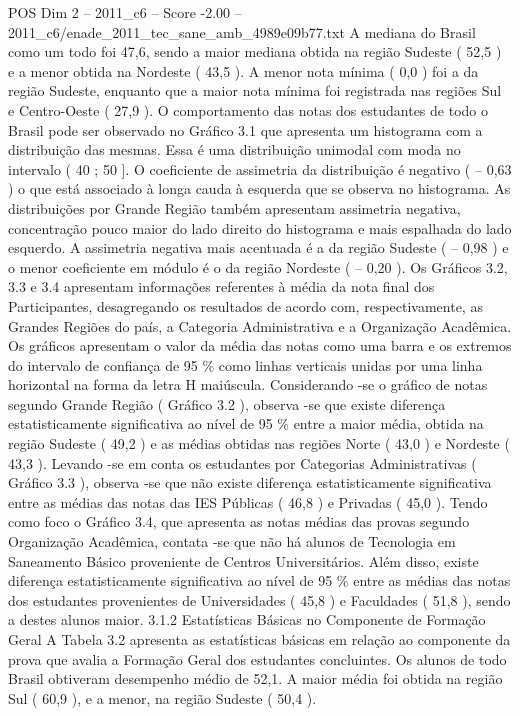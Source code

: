 \begin{textsample}{POS Dim 2 – 2011\_c6 – Score -2.00 – 2011\_c6/enade\_2011\_tec\_sane\_amb\_4989e09b77.txt}
A mediana do Brasil como um todo foi 47,6, sendo a maior mediana obtida na região Sudeste ( 52,5 ) e a menor obtida na Nordeste ( 43,5 ).
A menor nota mínima ( 0,0 ) foi a da região Sudeste, enquanto que a maior nota mínima foi registrada nas regiões Sul e Centro-Oeste ( 27,9 ).
O comportamento das notas dos estudantes de todo o Brasil pode ser observado no Gráfico 3.1 que apresenta um histograma com a distribuição das mesmas.
Essa é uma distribuição unimodal com moda no intervalo ( 40 ; 50 ].
O coeficiente de assimetria da distribuição é negativo ( – 0,63 ) o que está associado à longa cauda à esquerda que se observa no histograma.
As distribuições por Grande Região também apresentam assimetria negativa, concentração pouco maior do lado direito do histograma e mais espalhada do lado esquerdo.
A assimetria negativa mais acentuada é a da região Sudeste ( – 0,98 ) e o menor coeficiente em módulo é o da região Nordeste ( – 0,20 ).
Os Gráficos 3.2, 3.3 e 3.4 apresentam informações referentes à média da nota final dos Participantes, desagregando os resultados de acordo com, respectivamente, as Grandes Regiões do país, a Categoria Administrativa e a Organização Acadêmica.
Os gráficos apresentam o valor da média das notas como uma barra e os extremos do intervalo de confiança de 95 \% como linhas verticais unidas por uma linha horizontal na forma da letra H maiúscula.
Considerando -se o gráfico de notas segundo Grande Região ( Gráfico 3.2 ), observa -se que existe diferença estatisticamente significativa ao nível de 95 \% entre a maior média, obtida na região Sudeste ( 49,2 ) e as médias obtidas nas regiões Norte ( 43,0 ) e Nordeste ( 43,3 ).
Levando -se em conta os estudantes por Categorias Administrativas ( Gráfico 3.3 ), observa -se que não existe diferença estatisticamente significativa entre as médias das notas das IES Públicas ( 46,8 ) e Privadas ( 45,0 ).
Tendo como foco o Gráfico 3.4, que apresenta as notas médias das provas segundo Organização Acadêmica, contata -se que não há alunos de Tecnologia em Saneamento Básico proveniente de Centros Universitários.
Além disso, existe diferença estatisticamente significativa ao nível de 95 \% entre as médias das notas dos estudantes provenientes de Universidades ( 45,8 ) e Faculdades ( 51,8 ), sendo a destes alunos maior. 3.1.2 Estatísticas Básicas no Componente de Formação Geral A Tabela 3.2 apresenta as estatísticas básicas em relação ao componente da prova que avalia a Formação Geral dos estudantes concluintes.
Os alunos de todo Brasil obtiveram desempenho médio de 52,1.
A maior média foi obtida na região Sul ( 60,9 ), e a menor, na região Sudeste ( 50,4 ).

\end{textsample}
